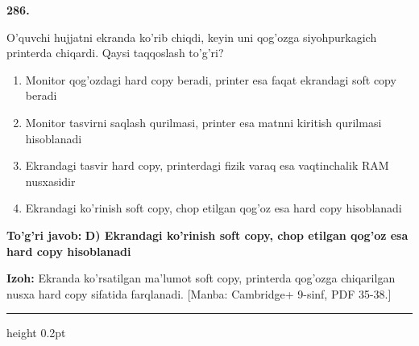 \documentclass[10pt,a4paper]{article}
\begin{document}
{\bfseries\sffamily\color{ink} 286.}
\par
O'quvchi hujjatni ekranda ko'rib chiqdi, keyin uni qog'ozga siyohpurkagich printerda chiqardi. Qaysi taqqoslash to'g'ri?
\begin{enumerate}[label=\Alph*),leftmargin=9mm]
\item Monitor qog'ozdagi hard copy beradi, printer esa faqat ekrandagi soft copy beradi
\item Monitor tasvirni saqlash qurilmasi, printer esa matnni kiritish qurilmasi hisoblanadi
\item Ekrandagi tasvir hard copy, printerdagi fizik varaq esa vaqtinchalik RAM nusxasidir
\item Ekrandagi ko'rinish soft copy, chop etilgan qog'oz esa hard copy hisoblanadi
\end{enumerate}
\begin{tcolorbox}[enhanced,breakable,colback=teal!4,colframe=teal!60!black,boxrule=0.45pt,arc=1.2mm,left=2.7mm,right=2.7mm,top=1.8mm,bottom=1.8mm,before skip=2mm,after skip=2mm]
{\bfseries\sffamily\color{teal}To'g'ri javob:} \textbf{D) Ekrandagi ko'rinish soft copy, chop etilgan qog'oz esa hard copy hisoblanadi}
\par\smallskip
{\bfseries Izoh:} Ekranda ko'rsatilgan ma'lumot soft copy, printerda qog'ozga chiqarilgan nusxa hard copy sifatida farqlanadi. [Manba: Cambridge+ 9-sinf, PDF 35-38.]
\end{tcolorbox}
\vspace{2mm}\hrule height 0.2pt\vspace{3mm}
\end{document}
